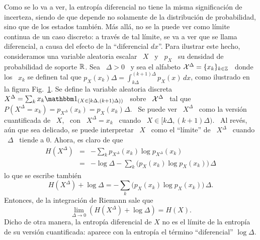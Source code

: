 Como se lo va a ver, la entrop\'ia diferencial no tiene la misma significaci\'on
de  incerteza,  siendo de  que  depende no  solamente  de  la distribuci\'on  de
probabilidad, sino que  de los estados tambi\'en.  M\'as all\'a,  no se la puede
ver como l\'imite  continua de un caso discreto: a trav\'es  de tal l\'imite, se
va  a ver  que se  llama diferencial,  a causa  del efecto  de  la ``diferencial
$dx$''.  Para ilustrar este hecho, consideramos una variable aleatoria escalar \
$X$ \ y \ $p_X$ \ su densidad de probabilidad de soporte $\mathbb{R}$.  Sea \ $\Delta
> 0$  \ y sea el alfabeto  $\mathcal{X}^\Delta = \{ x_k  \}_{k \in \mathbb{Z}}$ \  donde los \
$x_k$ se definen tal que $\displaystyle p_X(x_k) \Delta = \int_{k \Delta}^{(k+1)
  \Delta}     p_X(x)    \,     dx$,    como     ilustrado    en     la    figura
Fig.~\ref{Fig:SZ:CuantificacionX}.  Se  define la variable  aleatoria discreta \
$X^\Delta =  \sum_k x_k  \un_{(X \in  [k \Delta ,  (k+1) \Delta  ))}$ \  sobre \
$\mathcal{X}^\Delta$  \ tal  que  \ $P(X^\Delta  =  x_k) =  p_{X^\Delta}(x_k) =  p_X(x_k)
\Delta$.  \ Se puede ver \ $X^\Delta$ \ como la versi\'on cuantificada de \ $X$,
\ con \  $X^\Delta = x_k$ \ cuando \  $X \in [k \Delta , (k+1)  \Delta )$.  \ Al
rev\'es,  a\'un  que  sea  delicado,  se  puede interpretar  \  $X$  \  como  el
``l\'imite'' de \ $X^\Delta$  \ cuando \ $\Delta$ \ tiende a  0. Ahora, es claro
de que
%
\begin{eqnarray*}
H(X^\Delta) & = & - \sum_k p_{X^\Delta}(x_k) \log p_{X^\Delta}(x_k)\\[2.5mm]
%
& = & - \log \Delta - \sum_k \Big( p_X(x_k) \log p_X(x_k) \Big) \, \Delta
\end{eqnarray*}
%
lo que se escribe tambi\'en
%
\[
H(X^\Delta)  + \log  \Delta =  - \sum_k  \Big( p_X(x_k)  \log p_X(x_k)  \Big) \,
\Delta.
\]
%
Entonces, de la integraci\'on de Riemann sale que
%
\[
\lim_{\Delta \to 0} \left( H(X^\Delta) + \log \Delta \right) = H(X).
\]
%
Dicho de otra manera,  la entrop\'ia diferencial de $X$ no es  el l\'imite de la
entrop\'ia de su versi\'on cuantificada:  aparece con la entrop\'ia el t\'ermino
``diferencial'' $\log \Delta$.
%
\begin{figure}[h!]
%
\begin{center}  \end{center}
%
%
\label{Fig:SZ:CuantificacionX}
\end{figure}
%

